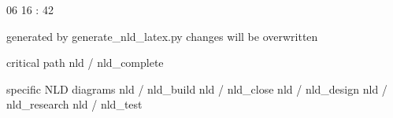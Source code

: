         06 16 : 42 %

        generated by generate_nld_latex.py %
        changes will be overwritten



    critical path
 {
  nld / nld_complete
}


    specific NLD diagrams
 {
  nld / nld_build
}
 { nld / nld_close }
 { nld / nld_design }
 { nld / nld_research }
 { nld / nld_test }
